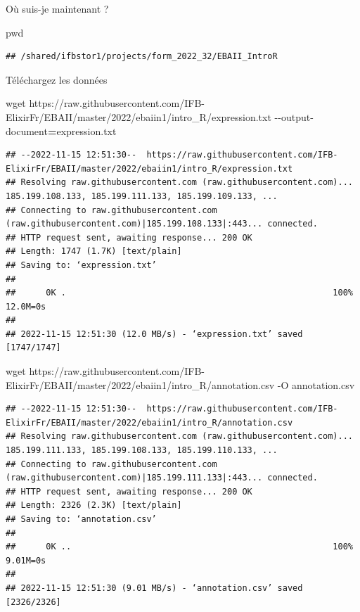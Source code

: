 \documentclass[
]{book}
\newenvironment{Shaded}{\begin{snugshade}}{\end{snugshade}}
\newcommand{\AttributeTok}[1]{\textcolor[rgb]{0.77,0.63,0.00}{#1}}
\newcommand{\BuiltInTok}[1]{#1}
\newcommand{\FunctionTok}[1]{\textcolor[rgb]{0.00,0.00,0.00}{#1}}
\newcommand{\NormalTok}[1]{#1}
\newcommand{\OperatorTok}[1]{\textcolor[rgb]{0.81,0.36,0.00}{\textbf{#1}}}
\begin{document}
Où suis-je maintenant ?

\begin{Shaded}
\begin{Highlighting}[]
\BuiltInTok{pwd}
\end{Highlighting}
\end{Shaded}

\begin{verbatim}
## /shared/ifbstor1/projects/form_2022_32/EBAII_IntroR
\end{verbatim}

Téléchargez les données

\begin{Shaded}
\begin{Highlighting}[]
\FunctionTok{wget}\NormalTok{ https://raw.githubusercontent.com/IFB{-}ElixirFr/EBAII/master/2022/ebaiin1/intro\_R/expression.txt }\AttributeTok{{-}{-}output{-}document}\OperatorTok{=}\NormalTok{expression.txt}
\end{Highlighting}
\end{Shaded}

\begin{verbatim}
## --2022-11-15 12:51:30--  https://raw.githubusercontent.com/IFB-ElixirFr/EBAII/master/2022/ebaiin1/intro_R/expression.txt
## Resolving raw.githubusercontent.com (raw.githubusercontent.com)... 185.199.108.133, 185.199.111.133, 185.199.109.133, ...
## Connecting to raw.githubusercontent.com (raw.githubusercontent.com)|185.199.108.133|:443... connected.
## HTTP request sent, awaiting response... 200 OK
## Length: 1747 (1.7K) [text/plain]
## Saving to: ‘expression.txt’
## 
##      0K .                                                     100% 12.0M=0s
## 
## 2022-11-15 12:51:30 (12.0 MB/s) - ‘expression.txt’ saved [1747/1747]
\end{verbatim}

\begin{Shaded}
\begin{Highlighting}[]
\FunctionTok{wget}\NormalTok{ https://raw.githubusercontent.com/IFB{-}ElixirFr/EBAII/master/2022/ebaiin1/intro\_R/annotation.csv }\AttributeTok{{-}O}\NormalTok{ annotation.csv}
\end{Highlighting}
\end{Shaded}

\begin{verbatim}
## --2022-11-15 12:51:30--  https://raw.githubusercontent.com/IFB-ElixirFr/EBAII/master/2022/ebaiin1/intro_R/annotation.csv
## Resolving raw.githubusercontent.com (raw.githubusercontent.com)... 185.199.111.133, 185.199.108.133, 185.199.110.133, ...
## Connecting to raw.githubusercontent.com (raw.githubusercontent.com)|185.199.111.133|:443... connected.
## HTTP request sent, awaiting response... 200 OK
## Length: 2326 (2.3K) [text/plain]
## Saving to: ‘annotation.csv’
## 
##      0K ..                                                    100% 9.01M=0s
## 
## 2022-11-15 12:51:30 (9.01 MB/s) - ‘annotation.csv’ saved [2326/2326]
\end{verbatim}
\end{document}
